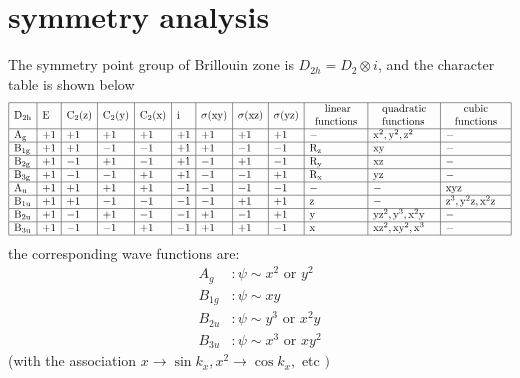 \documentclass[12pt]{article}
\numberwithin{equation}{section}
\begin{document}
\section{symmetry analysis}
The symmetry point group of Brillouin zone is $D_{2h} = D_2 \otimes i$, and the character table is shown below
$$
\begin{array}{|l|l|l|l|l|l|l|l|l|l|l|l|}
\hline \mathrm{D}_{2 \mathrm{h}} & \mathrm{E} & \mathrm{C}_{2}(\mathrm{z}) & \mathrm{C}_{2}(\mathrm{y}) & \mathrm{C}_{2}(\mathrm{x}) & \mathrm{i} & \sigma(\mathrm{xy}) & \sigma(\mathrm{xz}) & \sigma(\mathrm{yz}) & \begin{array}{c}
\text { linear} \\
\text{functions}
\end{array} & \begin{array}{l}
\text { quadratic } \\
\text { functions }
\end{array} & \begin{array}{c}
\text { cubic } \\
\text { functions }
\end{array} \\
\hline \mathrm{A}_{\mathrm{g}} & +1 & +1 & +1 & +1 & +1 & +1 & +1 & +1 & - & \mathrm{x}^{2}, \mathrm{y}^{2}, \mathrm{z}^{2} & - \\
\hline \mathrm{B}_{1 \mathrm{g}} & +1 & +1 & -1 & -1 & +1 & +1 & -1 & -1 & \mathrm{R}_{\mathrm{z}} & \mathrm{xy} & - \\
\hline \mathrm{B}_{2 \mathrm{g}} & +1 & -1 & +1 & -1 & +1 & -1 & +1 & -1 & \mathrm{R}_{\mathrm{y}} & \mathrm{xz} & - \\
\hline \mathrm{B}_{3 \mathrm{g}} & +1 & -1 & -1 & +1 & +1 & -1 & -1 & +1 & \mathrm{R}_{\mathrm{x}} & \mathrm{yz} & - \\
\hline \mathrm{A}_{\mathrm{u}} & +1 & +1 & +1 & +1 & -1 & -1 & -1 & -1 & - & - & \mathrm{xyz} \\
\hline \mathrm{B}_{1 \mathrm{u}} & +1 & +1 & -1 & -1 & -1 & -1 & +1 & +1 & \mathrm{z} & - & \mathrm{z}^{3}, \mathrm{y}^{2} \mathrm{z}, \mathrm{x}^{2} \mathrm{z} \\
\hline \mathrm{B}_{2 \mathrm{u}} & +1 & -1 & +1 & -1 & -1 & +1 & -1 & +1 & \mathrm{y} & \mathrm{yz}^{2}, \mathrm{y}^{3}, \mathrm{x}^{2} \mathrm{y} & -  \\
\hline \mathrm{B}_{3 \mathrm{u}} & +1 & -1 & -1 & +1 & -1 & +1 & +1 & -1 & \mathrm{x} & \mathrm{xz}^{2}, \mathrm{xy}^{2}, \mathrm{x}^{3} & - \\
\hline
\end{array}$$
the corresponding wave functions are:
\begin{equation}
	\begin{aligned}
	A_{g} & : \psi  \sim x^2 \text{ or } y^2 \\
	B_{1 g} &: \psi \sim xy \\
	B_{2u} &: \psi \sim y^3 \text{ or } x^2y\\
	B_{3u} &: \psi \sim x^3 \text{ or } xy^2
	\end{aligned}
	\end{equation}
	(with the association $x \rightarrow \sin k_{x}, x^{2} \rightarrow \cos k_{x},$ etc $)$
\end{document}
